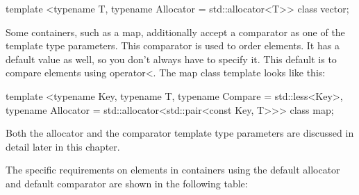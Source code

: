 \begin{cpp}
template <typename T, typename Allocator = std::allocator<T>> class vector;
\end{cpp}

Some containers, such as a map, additionally accept a comparator as one of the template type parameters. This comparator is used to order elements. It has a default value as well, so you don’t always have to specify it. This default is to compare elements using operator<. The map class template looks like this:

\begin{cpp}
template <typename Key, typename T, typename Compare = std::less<Key>,
    typename Allocator = std::allocator<std::pair<const Key, T>>> class map;
\end{cpp}

Both the allocator and the comparator template type parameters are discussed in detail later in this chapter.

The specific requirements on elements in containers using the default allocator and default comparator are shown in the following table:

